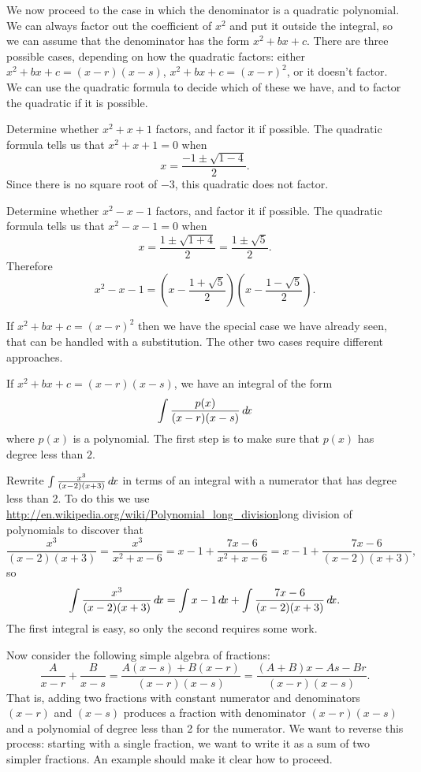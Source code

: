 \documentclass{ximera}
\begin{document}
We now proceed to the case in which the denominator is a quadratic
polynomial.  We can always factor out the coefficient of $x^2$ and put
it outside the integral, so we can assume that the denominator has the
form $x^2+bx+c$.  There are three possible cases, depending on how
the quadratic factors: either $x^2+bx+c=(x-r)(x-s)$,
$x^2+bx+c=(x-r)^2$, or it doesn't factor. We can use the quadratic
formula to decide which of these we have, and to factor the quadratic
if it is possible.

\begin{example}
Determine whether $x^2+x+1$ factors, and factor it if possible.
The quadratic formula tells us that $x^2+x+1=0$ when
\[
x=\frac{-1\pm\sqrt{1-4}}{2}.
\]
Since there is no square root of $-3$, this quadratic does not factor.
\end{example}

\begin{example}
Determine whether $x^2-x-1$ factors, and factor it if possible.
The quadratic formula tells us that $x^2-x-1=0$ when
\[
x=\frac{1\pm\sqrt{1+4}}{2}=\frac{1\pm\sqrt{5}}{2}.
\]
Therefore
\[
  x^2-x-1=\left(x-\frac{1+\sqrt{5}}{2}\right)\left(x-\frac{1-\sqrt{5}}{2}\right).
\]
\end{example}

If $x^2+bx+c=(x-r)^2$ then we have the special case we have already
seen, that can be handled with a substitution. The other two cases
require different approaches.

If  $x^2+bx+c=(x-r)(x-s)$, we have an integral of the form
\[
\int{p(x)\over (x-r)(x-s)}\mathop{}\!d\! x
\]
where $p(x)$ is a polynomial. The first step is to make sure that
$p(x)$ has degree less than $2$.

\begin{example}
Rewrite $\int \frac{x^3}{(x-2)(x+3)}\mathop{}\!d\! x$ in terms of an integral
with a numerator that has degree less than 2. To do this we use 
\url{http://en.wikipedia.org/wiki/Polynomial_long_division}long
division of polynomials  to 
discover that
\[
  \frac{x^3}{(x-2)(x+3)}=\frac{x^3}{x^2+x-6}=x-1+\frac{7x-6}{x^2+x-6}=
  x-1+\frac{7x-6}{(x-2)(x+3)},
\]
so 
\[
  \int \frac{x^3}{(x-2)(x+3)}\mathop{}\!d\! x=\int x-1\mathop{}\!d\! x +\int \frac{7x-6}{(x-2)(x+3)}\mathop{}\!d\! x.
\]
The first integral is easy, so only the second requires some work.
\end{example}

Now consider the following simple algebra of fractions:
\[
  \frac{A}{x-r}+\frac{B}{x-s}=\frac{A(x-s)+B(x-r)}{(x-r)(x-s)}=
  \frac{(A+B)x-As-Br}{(x-r)(x-s)}.
\]
That is, adding two fractions with constant numerator and denominators
$(x-r)$ and $(x-s)$ produces a fraction with denominator $(x-r)(x-s)$
and a polynomial of degree less than 2 for the numerator. We want to
reverse this process: starting with a single fraction, we want to
write it as a sum of two simpler fractions. An example should make it
clear how to proceed.
\end{document}
